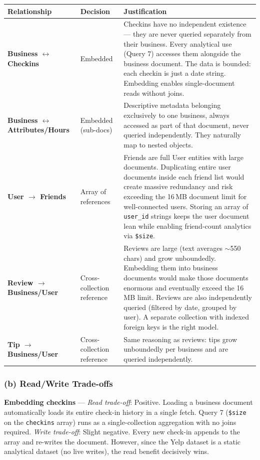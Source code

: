 \documentclass[12pt,a4paper]{article}
\newcommand{\code}[1]{\texttt{#1}}
\begin{document}
\begin{longtable}{>{\bfseries}p{3.2cm}p{2.2cm}p{8.6cm}}
  \toprule
  Relationship & Decision & Justification \\
  \midrule
  \endhead
  Business $\leftrightarrow$ Checkins
    & Embedded
    & Checkins have no independent existence --- they are never queried
      separately from their business. Every analytical use (Query 7) accesses
      them alongside the business document. The data is bounded: each checkin
      is just a date string. Embedding enables single-document reads without
      joins. \\[6pt]
  Business $\leftrightarrow$ Attributes/Hours
    & Embedded (sub-docs)
    & Descriptive metadata belonging exclusively to one business, always
      accessed as part of that document, never queried independently. They
      naturally map to nested objects. \\[6pt]
  User $\rightarrow$ Friends
    & Array of references
    & Friends are full User entities with large documents. Duplicating entire
      user documents inside each friend list would create massive redundancy
      and risk exceeding the 16\,MB document limit for well-connected users.
      Storing an array of \code{user\_id} strings keeps the user document lean
      while enabling friend-count analytics via \code{\$size}. \\[6pt]
  Review $\rightarrow$ Business/User
    & Cross-collection reference
    & Reviews are large (text averages $\sim$550 chars) and grow unboundedly.
      Embedding them into business documents would make those documents
      enormous and eventually exceed the 16\,MB limit. Reviews are also
      independently queried (filtered by date, grouped by user). A separate
      collection with indexed foreign keys is the right model. \\[6pt]
  Tip $\rightarrow$ Business/User
    & Cross-collection reference
    & Same reasoning as reviews: tips grow unboundedly per business and are
      queried independently. \\
  \bottomrule
\end{longtable}

\subsubsection{(b) Read/Write Trade-offs}

\textbf{Embedding checkins} --- \textit{Read trade-off}: Positive. Loading a
business document automatically loads its entire check-in history in a single
fetch. Query 7 (\code{\$size} on the \code{checkins} array) runs as a
single-collection aggregation with no joins required. \textit{Write trade-off}:
Slight negative. Every new check-in appends to the array and re-writes the
document. However, since the Yelp dataset is a static analytical dataset (no
live writes), the read benefit decisively wins.
\end{document}
